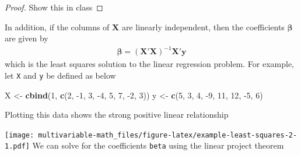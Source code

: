 \documentclass[
]{book}
\newenvironment{Shaded}{\begin{snugshade}}{\end{snugshade}}
\newcommand{\CommentTok}[1]{\textcolor[rgb]{0.56,0.35,0.01}{\textit{#1}}}
\newcommand{\DataTypeTok}[1]{\textcolor[rgb]{0.13,0.29,0.53}{#1}}
\newcommand{\DecValTok}[1]{\textcolor[rgb]{0.00,0.00,0.81}{#1}}
\newcommand{\KeywordTok}[1]{\textcolor[rgb]{0.13,0.29,0.53}{\textbf{#1}}}
\newcommand{\NormalTok}[1]{#1}
\newcommand{\OperatorTok}[1]{\textcolor[rgb]{0.81,0.36,0.00}{\textbf{#1}}}
\newcommand{\StringTok}[1]{\textcolor[rgb]{0.31,0.60,0.02}{#1}}
\theoremstyle{definition}
\theoremstyle{definition}
\theoremstyle{definition}
\theoremstyle{definition}
\theoremstyle{remark}
\begin{document}
\begin{proof}
Show this in class
\end{proof}

In addition, if the columns of \(\mathbf{X}\) are linearly independent, then the coefficients \(\boldsymbol{\beta}\) are given by
\[
\begin{aligned}
\boldsymbol{\beta} = \left( \mathbf{X}'\mathbf{X} \right)^{-1} \mathbf{X}' \mathbf{y}
\end{aligned}
\]
which is the least squares solution to the linear regression problem. For example, let \texttt{X} and \texttt{y} be defined as below

\begin{Shaded}
\begin{Highlighting}[]
\NormalTok{X <-}\StringTok{ }\KeywordTok{cbind}\NormalTok{(}\DecValTok{1}\NormalTok{, }\KeywordTok{c}\NormalTok{(}\DecValTok{2}\NormalTok{, }\DecValTok{-1}\NormalTok{, }\DecValTok{3}\NormalTok{, }\DecValTok{-4}\NormalTok{, }\DecValTok{5}\NormalTok{, }\DecValTok{7}\NormalTok{, }\DecValTok{-2}\NormalTok{, }\DecValTok{3}\NormalTok{))}
\NormalTok{y <-}\StringTok{ }\KeywordTok{c}\NormalTok{(}\DecValTok{5}\NormalTok{, }\DecValTok{3}\NormalTok{, }\DecValTok{4}\NormalTok{, }\DecValTok{-9}\NormalTok{, }\DecValTok{11}\NormalTok{, }\DecValTok{12}\NormalTok{, }\DecValTok{-5}\NormalTok{, }\DecValTok{6}\NormalTok{)}
\end{Highlighting}
\end{Shaded}

Plotting this data shows the strong positive linear relationship

\begin{Shaded}
\end{Shaded}

\texttt{[image: multivariable-math\_files/figure-latex/example-least-squares-2-1.pdf]}
We can solve for the coefficients \texttt{beta} using the linear project theorem

\begin{Shaded}
\end{Shaded}
\end{document}
